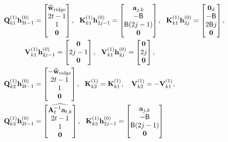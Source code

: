 \documentclass[10pt]{article}
\renewcommand{\hat}{\widehat}
\newcommand{\<}{\left\langle}
\renewcommand{\>}{\right\rangle}
\renewcommand{\bQ}{\mathbf{Q}}
\newcommand{\bzero}{{\mathbf 0}}
\newcommand{\ridge}{{\rm ridge}}
\newcommand{\tfthres}{{\mathsf{B}}}
\def\bA{{\mathbf A}}
\def\bK{{\mathbf K}}
\def\bQ{{\mathbf Q}}
\def\bV{{\mathbf V}}
\def\ba{{\mathbf a}}
\def\bh{{\mathbf h}}
\def\bw{{\mathbf w}}
\begin{document}
\begin{align*}
    &\bQ^{(1)}_{k1}\bh^{(0)}_{2t-1}=\begin{bmatrix}
        \hat\bw_{\ridge} \\2t-1\\ 1\\\bzero
    \end{bmatrix},~~ \bK^{(1)}_{k1}\bh^{(0)}_{2j-1}=\begin{bmatrix}
        \ba_{j,k}\\  -\tfthres \\ \tfthres (2j-1)\\\bzero
    \end{bmatrix},~~
    \bK^{(1)}_{k1}\bh^{(0)}_{2j}=\begin{bmatrix}
        \bzero_d\\  -\tfthres \\ 2\tfthres j\\\bzero
    \end{bmatrix},\\
    &~~~\qquad\bV^{(1)}_{k1}\bh^{(0)}_{2j-1}=\begin{bmatrix}
        \bzero\\ 2j-1 \\ \bzero
\end{bmatrix},~~\bV^{(1)}_{k1}\bh^{(0)}_{2j}=\begin{bmatrix}
        \bzero\\ 2j \\ \bzero
    \end{bmatrix},\\
    &
    \bQ^{(1)}_{k2}\bh^{(0)}_{2t-1}=\begin{bmatrix}
        -\hat\bw_{\ridge} \\2t-1\\1\\\bzero
    \end{bmatrix},~~  \bK^{(1)}_{k2}=\bK^{(1)}_{k1},~~  \ \bV^{(1)}_{k2}=-\bV^{(1)}_{k1},\\
    &
    \bQ^{(1)}_{k3}\bh^{(0)}_{2t-1}=\begin{bmatrix}
        \widehat{\bA_t^{-1}\ba_{t,k}} \\2t-1\\ 1\\\bzero
    \end{bmatrix},~~ \bK^{(1)}_{k3}\bh^{(0)}_{2j-1}=\begin{bmatrix}
        \ba_{j,k}\\  -\tfthres \\ \tfthres (2j-1)\\\bzero

\end{bmatrix}
\end{align*}
\end{document}

